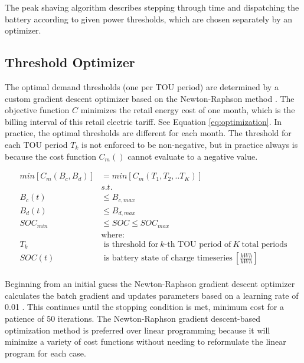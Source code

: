 \documentclass[journal,article,submit,pdftex,moreauthors]{Definitions/mdpi}
\begin{document}
The peak shaving algorithm describes stepping through time and dispatching the battery according to given power thresholds, which are chosen separately by an optimizer.

\subsection{Threshold Optimizer}\label{threshold-optimizer}%

The optimal demand thresholds (one per TOU period) are determined by a custom gradient descent optimizer based on the Newton-Raphson method \cite{Truong2019}. The objective function \(C\) minimizes the retail energy cost of one month, which is the billing interval of this retail electric tariff. See Equation \ref{eq:optimization}. In practice, the optimal thresholds are different for each month. The threshold for each TOU period \(T_k\) is not enforced to be non-negative, but in practice always is because the cost function \(C_m()\) cannot evaluate to a negative value.

\begin{equation}
  \label{eq:optimization}
  \begin{split}
    min[C_m(B_c,B_d)] & = min[C_m(T_1,T_2,..T_K)]                                                    \\
                      & s.t.                                                                         \\
    B_c(t)            & \le B_{c,max}                                                                \\
    B_d(t)            & \le B_{d,max}                                                                \\
    SOC_{min}         & \le SOC \le SOC_{max}                                                        \\
                      & \text{where:}                                                                \\
    T_k               & \text{ is threshold for}\ k\text{-th TOU period of}\ K\ \text{total periods} \\
    SOC(t)            & \text{ is battery state of charge timeseries}\ [\frac{kWh}{kWh}]             \\
  \end{split}
\end{equation}

Beginning from an initial guess the Newton-Raphson gradient descent optimizer calculates the batch gradient and updates parameters based on a learning rate of 0.01 \cite{Truong2019}. This continues until the stopping condition is met, minimum cost for a patience of 50 iterations. The Newton-Raphson gradient descent-based optimization method is preferred over linear programming because it will minimize a variety of cost functions without needing to reformulate the linear program for each case.
\end{document}
